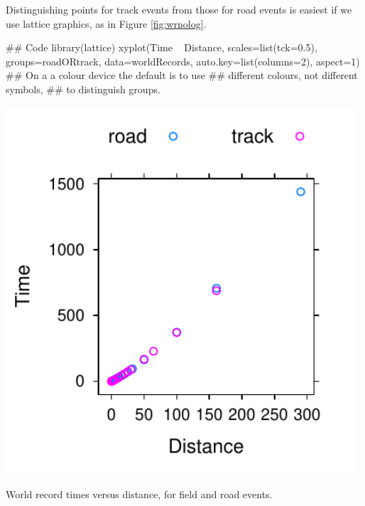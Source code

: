 \begin{fullwidth}
\begin{Schunk}
\end{Schunk}
\end{fullwidth}

Distinguishing points for track events from those for road events is
easiest if we use lattice graphics, as in Figure \ref{fig:wrnolog}.

\begin{Schunk}
\begin{Sinput}
## Code
library(lattice)
xyplot(Time ~ Distance, scales=list(tck=0.5),
       groups=roadORtrack, data=worldRecords,
       auto.key=list(columns=2), aspect=1)
## On a a colour device the default is to use
## different colours, not different symbols,
## to distinguish groups.
\end{Sinput}
\end{Schunk}

\begin{marginfigure}
\begin{Schunk}


\centerline{\includegraphics[width=0.98\textwidth]{figs/03-trackVSroad-1} }

\end{Schunk}
\caption{World record times versus distance, for field and road
  events.\label{fig:wrnolog}}
\end{marginfigure}

